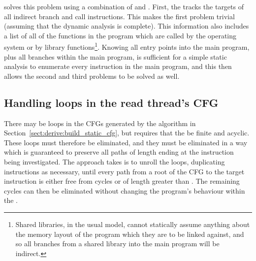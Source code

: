 {\Implementation} solves this problem using a combination of
 and .  First, the
 tracks the targets of all indirect branch
and call instructions.  This makes the first problem trivial (assuming
that the dynamic analysis is complete).  This information also
includes a list of all of the functions in the program which are
called by the operating system or by library functions\footnote{Shared
  libraries, in the usual model, cannot statically assume anything
  about the memory layout of the program which they are to be linked
  against, and so all branches from a shared library into the main
  program will be indirect.}.  Knowing all entry points into the main
program, plus all branches within the main program, is sufficient for
a simple static analysis to enumerate every instruction in the main
program, and this then allows the second and third problems to be
solved as well.


\subsection{Handling loops in the read thread's CFG}
\label{sect:derive:handling_loops}

There may be loops in the CFGs generated by the algorithm in
Section~\ref{sect:derive:build_static_cfg}, but {\technique} requires
that the {\StateMachines} be finite and acyclic.  These loops must
therefore be eliminated, and they must be eliminated in a way which is
guaranteed to preserve all paths of length \backref{$\alpha$} ending
at the instruction being investigated.  The approach {\technique}
takes is to unroll the loops, duplicating instructions as necessary,
until every path from a root of the CFG to the target instruction is
either free from cycles or of length greater than \backref{$\alpha$}.
The remaining cycles can then be eliminated without changing the
program's behaviour within the .

